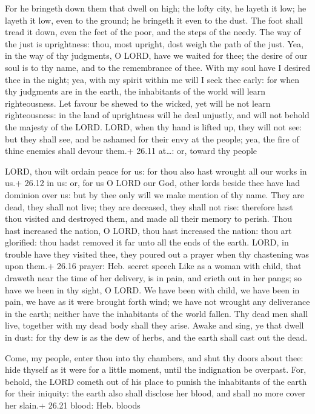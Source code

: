  For he bringeth down them that dwell on high; the lofty
city, he layeth it low; he layeth it low, even to the ground; he
bringeth it even to the dust.  The foot shall tread it down,
even the feet of the poor, and the steps of the needy.  The
way of the just is uprightness: thou, most upright, dost weigh the path
of the just.  Yea, in the way of thy judgments, O LORD, have
we waited for thee; the desire of our soul is to thy name, and to the
remembrance of thee.  With my soul have I desired thee in
the night; yea, with my spirit within me will I seek thee early: for
when thy judgments are in the earth, the inhabitants of the world will
learn righteousness.  Let favour be shewed to the wicked,
yet will he not learn righteousness: in the land of uprightness will he
deal unjustly, and will not behold the majesty of the LORD.
 LORD, when thy hand is lifted up, they will not see: but
they shall see, and be ashamed for their envy at the people; yea, the
fire of thine enemies shall devour them.+ 26.11 at\ldots: or, toward thy
people

 LORD, thou wilt ordain peace for us: for thou also hast
wrought all our works in us.+ 26.12 in us: or, for us  O
LORD our God, other lords beside thee have had dominion over us: but by
thee only will we make mention of thy name.  They are dead,
they shall not live; they are deceased, they shall not rise: therefore
hast thou visited and destroyed them, and made all their memory to
perish.  Thou hast increased the nation, O LORD, thou hast
increased the nation: thou art glorified: thou hadst removed it far unto
all the ends of the earth.  LORD, in trouble have they
visited thee, they poured out a prayer when thy chastening was upon
them.+ 26.16 prayer: Heb. secret speech  Like as a woman
with child, that draweth near the time of her delivery, is in pain, and
crieth out in her pangs; so have we been in thy sight, O LORD.
 We have been with child, we have been in pain, we have as
it were brought forth wind; we have not wrought any deliverance in the
earth; neither have the inhabitants of the world fallen. 
Thy dead men shall live, together with my dead body shall they arise.
Awake and sing, ye that dwell in dust: for thy dew is as the dew of
herbs, and the earth shall cast out the dead.

 Come, my people, enter thou into thy chambers, and shut
thy doors about thee: hide thyself as it were for a little moment, until
the indignation be overpast.  For, behold, the LORD cometh
out of his place to punish the inhabitants of the earth for their
iniquity: the earth also shall disclose her blood, and shall no more
cover her slain.+ 26.21 blood: Heb. bloods

